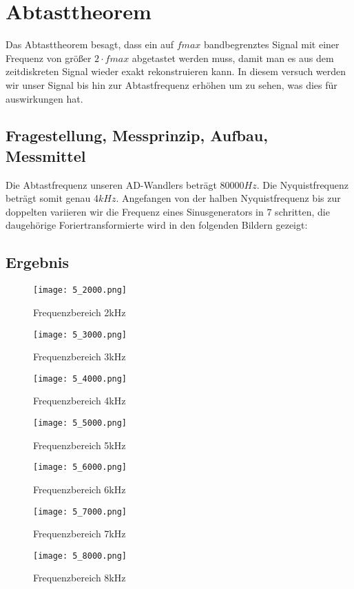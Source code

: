 %
%
\chapter{Abtasttheorem}
Das Abtasttheorem besagt, dass ein auf $fmax$ bandbegrenztes Signal mit einer Frequenz von größer $2 \cdot fmax$ abgetastet werden muss, damit man es aus dem zeitdiskreten Signal wieder exakt rekonstruieren kann.
In diesem versuch werden wir unser Signal bis hin zur Abtastfrequenz erhöhen um zu sehen, was dies für auswirkungen hat.
\label{chap:Abtasttheorem}
\section{Fragestellung, Messprinzip, Aufbau, Messmittel}
\label{chap:VERSUCH_5_FRAGESTELLUNG}
Die Abtastfrequenz unseren AD-Wandlers beträgt 80000$Hz$. Die Nyquistfrequenz beträgt somit genau 4$kHz$.
Angefangen von der halben Nyquistfrequenz bis zur doppelten variieren wir die Frequenz eines Sinusgenerators in 7 schritten, die daugehörige Foriertransformierte wird in den folgenden Bildern gezeigt:
\section{Ergebnis}
\label{chap:VERSUCH_5_MESSWERTE}

\begin{figure}[H]
\centering
\texttt{[image: 5\_2000.png]}
\caption{Frequenzbereich 2kHz}
\label{fig:F2}
\end{figure}
\begin{figure}[H]
\centering
\texttt{[image: 5\_3000.png]}
\caption{Frequenzbereich 3kHz}
\label{fig:F3}
\end{figure}
\begin{figure}[H]
\centering
\texttt{[image: 5\_4000.png]}
\caption{Frequenzbereich 4kHz}
\label{fig:F4}
\end{figure}
\begin{figure}[H]
\centering
\texttt{[image: 5\_5000.png]}
\caption{Frequenzbereich 5kHz}
\label{fig:F5}
\end{figure}
\begin{figure}[H]
\centering
\texttt{[image: 5\_6000.png]}
\caption{Frequenzbereich 6kHz}
\label{fig:F6}
\end{figure}
\begin{figure}[H]
\centering
\texttt{[image: 5\_7000.png]}
\caption{Frequenzbereich 7kHz}
\label{fig:F7}
\end{figure}
\begin{figure}[H]
\centering
\texttt{[image: 5\_8000.png]}
\caption{Frequenzbereich 8kHz}
\label{fig:F8}
\end{figure}


